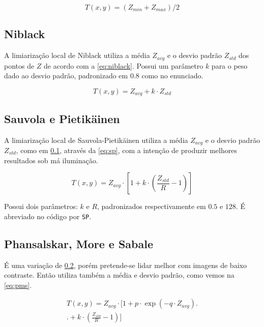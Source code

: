 \documentclass[brazilian,a4paper,twocolumn]{article}
\begin{document}
        \begin{equation}
        \label{eq:bernsen}
            T(x, y) = (Z_{min} + Z_{max}) / 2
        \end{equation}

    \subsection{Niblack}
    \label{sec:niblack}

        A limiarização local de Niblack utiliza a média $Z_{avg}$ e o desvio padrão $Z_{std}$ dos pontos de $Z$ de acordo com a \cref{eq:niblack}. Possui um parâmetro $k$ para o peso dado ao desvio padrão, padronizado em $0.8$ como no enunciado.

        \begin{equation}
        \label{eq:niblack}
            T(x, y) = Z_{avg} + k \cdot Z_{std}
        \end{equation}

    \subsection{Sauvola e Pietikäinen}
    \label{sec:sp}

        A limiarização local de Sauvola-Pietikäinen utiliza a média $Z_{avg}$ e o desvio padrão $Z_{std}$, como em \ref{sec:niblack}, através da \cref{eq:sp}, com a intenção de produzir melhores resultados sob má iluminação.

        \begin{equation}
        \label{eq:sp}
            T(x, y) = Z_{avg} \cdot \left[ 1 +  k \cdot \left( \frac{Z_{std}}{R} - 1\right) \right]
        \end{equation}

        Possui dois parâmetros: $k$ e $R$, padronizados respectivamente em $0.5$ e $128$. É abreviado no código por \texttt{SP}.

    \subsection{Phansalskar, More e Sabale}

        É uma variação de \ref{sec:sp}, porém pretende-se lidar melhor com imagens de baixo contraste. Então utiliza também a média e desvio padrão, como vemos na \cref{eq:pms}.

        \begin{multline}
        \label{eq:pms}
            T(x, y) = Z_{avg} \cdot \Biggl[ 1 +  p \cdot \exp{ \left( -q \cdot Z_{avg} \right) } \Biggr. \\ \Biggl. + k \cdot \left( \frac{Z_{std}}{R} - 1 \right) \Biggr]
        \end{multline}
\end{document}
